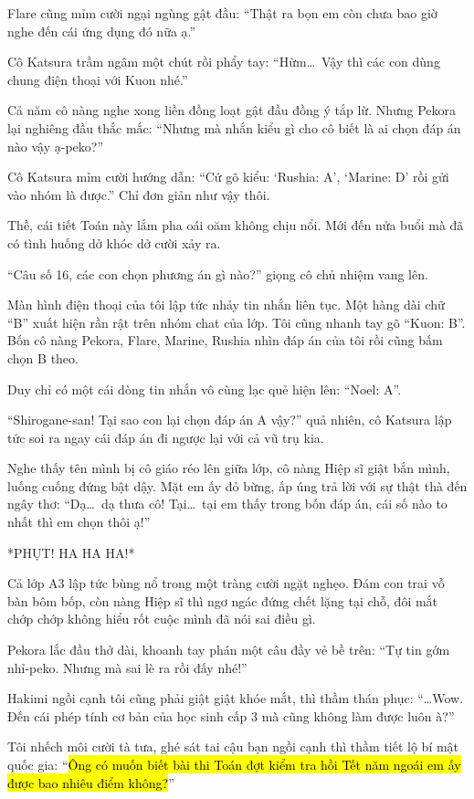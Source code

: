 \documentclass[../main.tex]{subfiles}
\begin{document}
Flare cũng mỉm cười ngại ngùng gật đầu: ``Thật ra bọn em còn chưa bao giờ nghe đến cái ứng dụng đó nữa ạ.''

Cô Katsura trầm ngâm một chút rồi phẩy tay: ``Hừm\dots\ Vậy thì các con dùng chung điện thoại với Kuon nhé.''

Cả năm cô nàng nghe xong liền đồng loạt gật đầu đồng ý tắp lừ. Nhưng Pekora lại nghiêng đầu thắc mắc: ``Nhưng mà nhắn kiểu gì cho cô biết là ai chọn đáp án nào vậy ạ-peko?''

Cô Katsura mỉm cười hướng dẫn: ``Cứ gõ kiểu: `Rushia: A', `Marine: D' rồi gửi vào nhóm là được.'' Chỉ đơn giản như vậy thôi.

Thề, cái tiết Toán này lắm pha oái oăm không chịu nổi. Mới đến nửa buổi mà đã có tình huống dở khóc dở cười xảy ra.

``Câu số 16, các con chọn phương án gì nào?'' giọng cô chủ nhiệm vang lên.

Màn hình điện thoại của tôi lập tức nhảy tin nhắn liên tục. Một hàng dài chữ ``B'' xuất hiện rần rật trên nhóm chat của lớp. Tôi cũng nhanh tay gõ ``Kuon: B''. Bốn cô nàng Pekora, Flare, Marine, Rushia nhìn đáp án của tôi rồi cũng bấm chọn B theo.

Duy chỉ có một cái dòng tin nhắn vô cùng lạc quẻ hiện lên: ``Noel: A''.

``Shirogane-san! Tại sao con lại chọn đáp án A vậy?'' quả nhiên, cô Katsura lập tức soi ra ngay cái đáp án đi ngược lại với cả vũ trụ kia.

Nghe thấy tên mình bị cô giáo réo lên giữa lớp, cô nàng Hiệp sĩ giật bắn mình, luống cuống đứng bật dậy. Mặt em ấy đỏ bừng, ấp úng trả lời với sự thật thà đến ngây thơ: ``Dạ\dots\ dạ thưa cô! Tại\dots\ tại em thấy trong bốn đáp án, cái số nào to nhất thì em chọn thôi ạ!''

*PHỤT! HA HA HA!*

Cả lớp A3 lập tức bùng nổ trong một tràng cười ngặt nghẹo. Đám con trai vỗ bàn bôm bốp, còn nàng Hiệp sĩ thì ngơ ngác đứng chết lặng tại chỗ, đôi mắt chớp chớp không hiểu rốt cuộc mình đã nói sai điều gì.

Pekora lắc đầu thở dài, khoanh tay phán một câu đầy vẻ bề trên: ``Tự tin gớm nhỉ-peko. Nhưng mà sai lè ra rồi đấy nhé!''

Hakimi ngồi cạnh tôi cũng phải giật giật khóe mắt, thì thầm thán phục: ``\dots Wow. Đến cái phép tính cơ bản của học sinh cấp 3 mà cũng không làm được luôn à?''

Tôi nhếch môi cười tà tưa, ghé sát tai cậu bạn ngồi cạnh thì thầm tiết lộ bí mật quốc gia: ``\hl{Ông có muốn biết bài thi Toán đợt kiểm tra hồi Tết năm ngoái em ấy được bao nhiêu điểm không?}''
\end{document}
